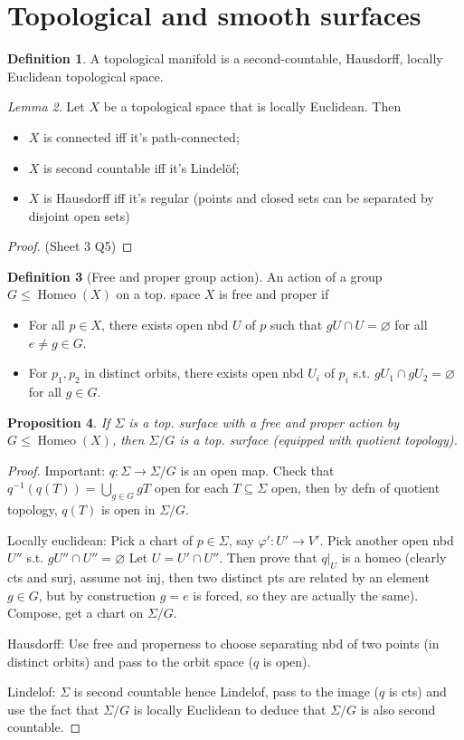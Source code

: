 \documentclass{article}
\theoremstyle{definition}
\newtheorem{defn}{Definition}[section]
\theoremstyle{remark}
\newtheorem{lem}[defn]{Lemma}
\theoremstyle{plain}
\newtheorem{prop}[defn]{Proposition}
\theoremstyle{definition}
\begin{document}
\section{Topological and smooth surfaces}
\begin{defn}
    A topological manifold is a second-countable, Hausdorff, locally Euclidean topological space.
\end{defn}
\begin{lem}
    Let $X$ be a topological space that is locally Euclidean. Then
    \begin{itemize}
        \item $X$ is connected iff it's path-connected;
        \item $X$ is second countable iff it's Lindel\"of;
        \item $X$ is Hausdorff iff it's regular (points and closed sets can be separated by disjoint open sets)
    \end{itemize}
\end{lem}
\begin{proof}
    (Sheet 3 Q5)
\end{proof}
\begin{defn}[Free and proper group action]
    An action of a group $G\le\operatorname{Homeo}(X)$ on a top. space $X$ is free and proper if
    \begin{itemize}
        \item For all $p\in X$, there exists open nbd $U$ of $p$ such that $gU\cap U=\varnothing$ for all $e\neq g\in G$.
        \item For $p_1, p_2$ in distinct orbits, there exists open nbd $U_i$ of $p_i$ s.t. $gU_1\cap gU_2=\varnothing$ for all $g\in G$.
    \end{itemize}
\end{defn}
\begin{prop}
    If $\Sigma$ is a top. surface with a free and proper action by $G\le\operatorname{Homeo}(X)$, then $\Sigma/G$ is a top. surface (equipped with quotient topology).
\end{prop}
\begin{proof}
    Important: $q:\Sigma\to\Sigma/G$ is an open map. Check that $q^{-1}(q(T))=\bigcup_{g\in G}gT$ open for each $T\subseteq\Sigma$ open, then by defn of quotient topology, $q(T)$ is open in $\Sigma/G$.

    Locally euclidean: Pick a chart of $p\in \Sigma$, say $\varphi':U'\to V'$. Pick another open nbd $U''$ s.t. $gU''\cap U''=\varnothing$ Let $U=U'\cap U''$. Then prove that $q|_U$ is a homeo (clearly cts and surj, assume not inj, then two distinct pts are related by an element $g\in G$, but by construction $g=e$ is forced, so they are actually the same). Compose, get a chart on $\Sigma/G$.

    Hausdorff: Use free and properness to choose separating nbd of two points (in distinct orbits) and pass to the orbit space ($q$ is open).

    Lindelof: $\Sigma$ is second countable hence Lindelof, pass to the image ($q$ is cts) and use the fact that $\Sigma/G$ is locally Euclidean to deduce that $\Sigma/G$ is also second countable.
\end{proof}
\end{document}
